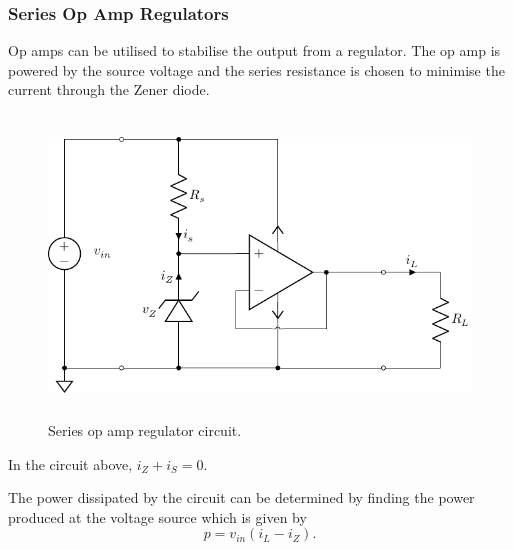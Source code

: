 \documentclass{article}
\begin{document}
\subsubsection{Series Op Amp Regulators}
Op amps can be utilised to stabilise the output from a regulator.
The op amp is powered by the source voltage and the series resistance is chosen to minimise the current through the Zener diode.
\begin{figure}[H]
    \centering
    \includegraphics[height = 8cm, keepaspectratio = true]{figures/series_op_amp_regulator.pdf}
    \caption{Series op amp regulator circuit.}
\end{figure}
In the circuit above, \(i_Z + i_S = 0\).

The power dissipated by the circuit can be determined by finding the power produced at the voltage source
which is given by
\begin{equation*}
    p = v_{in} \left( i_L - i_Z \right).
\end{equation*}
\newpage
\listoffigures
\end{document}
